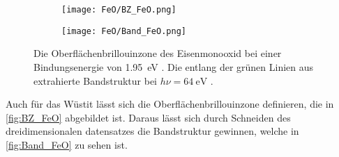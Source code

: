         \begin{figure}
            \begin{subfigure}[t]{0.34\textwidth}
                \centering
                \texttt{[image: FeO/BZ\_FeO.png]}
                \subcaption{}
                \label{fig:BZ_FeO}
            \end{subfigure}
            \begin{subfigure}[t]{0.62\textwidth}
                \centering
                \texttt{[image: FeO/Band\_FeO.png]}
                \subcaption{}
                \label{fig:Band_FeO}
            \end{subfigure}
            \caption{Die Oberflächenbrillouinzone des Eisenmonooxid bei einer Bindungsenergie von \SI{1.95}{\electronvolt} .
            Die entlang der grünen Linien aus  extrahierte Bandstruktur bei $h\nu = \SI{64}{\electronvolt}$ .}
        \end{figure}
        Auch für das Wüstit lässt sich die Oberflächenbrillouinzone definieren, die in \autoref{fig:BZ_FeO} abgebildet ist.
        Daraus lässt sich durch Schneiden des dreidimensionalen datensatzes die Bandstruktur gewinnen, welche in \autoref{fig:Band_FeO} zu sehen ist.

